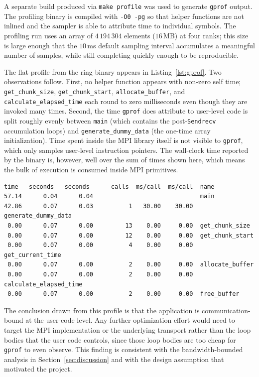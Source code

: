 \documentclass[12pt,a4paper]{article}
\begin{document}
A separate build produced via \texttt{make profile} was used to generate \texttt{gprof} output. The profiling binary is compiled with \texttt{-O0 -pg} so that helper functions are not inlined and the sampler is able to attribute time to individual symbols. The profiling run uses an array of $4\,194\,304$ elements ($16$\,MB) at four ranks; this size is large enough that the $10$\,ms default sampling interval accumulates a meaningful number of samples, while still completing quickly enough to be reproducible.

The flat profile from the ring binary appears in Listing~\ref{lst:gprof}. Two observations follow. First, no helper function appears with non-zero self time; \texttt{get\_chunk\_size}, \texttt{get\_chunk\_start}, \texttt{allocate\_buffer}, and \texttt{calculate\_elapsed\_time} each round to zero milliseconds even though they are invoked many times. Second, the time \texttt{gprof} does attribute to user-level code is split roughly evenly between \texttt{main} (which contains the post-\texttt{Sendrecv} accumulation loops) and \texttt{generate\_dummy\_data} (the one-time array initialization). Time spent inside the MPI library itself is not visible to \texttt{gprof}, which only samples user-level instruction pointers. The wall-clock time reported by the binary is, however, well over the sum of times shown here, which means the bulk of execution is consumed inside MPI primitives.

\begin{lstlisting}[caption={\texttt{gprof} flat profile of the ring binary, $n=4$, $M=16$\,MB. Library time inside MPI is not attributed to any symbol because \texttt{gprof} does not instrument shared libraries.},label={lst:gprof}]
%   cumulative   self                self     total
time   seconds   seconds      calls  ms/call  ms/call  name
57.14      0.04      0.04                              main
42.86      0.07      0.03          1   30.00    30.00  generate_dummy_data
 0.00      0.07      0.00         13    0.00     0.00  get_chunk_size
 0.00      0.07      0.00         12    0.00     0.00  get_chunk_start
 0.00      0.07      0.00          4    0.00     0.00  get_current_time
 0.00      0.07      0.00          2    0.00     0.00  allocate_buffer
 0.00      0.07      0.00          2    0.00     0.00  calculate_elapsed_time
 0.00      0.07      0.00          2    0.00     0.00  free_buffer
\end{lstlisting}

The conclusion drawn from this profile is that the application is communication-bound at the user-code level. Any further optimization effort would need to target the MPI implementation or the underlying transport rather than the loop bodies that the user code controls, since those loop bodies are too cheap for \texttt{gprof} to even observe. This finding is consistent with the bandwidth-bounded analysis in Section~\ref{sec:discussion} and with the design assumption that motivated the project.
\end{document}
